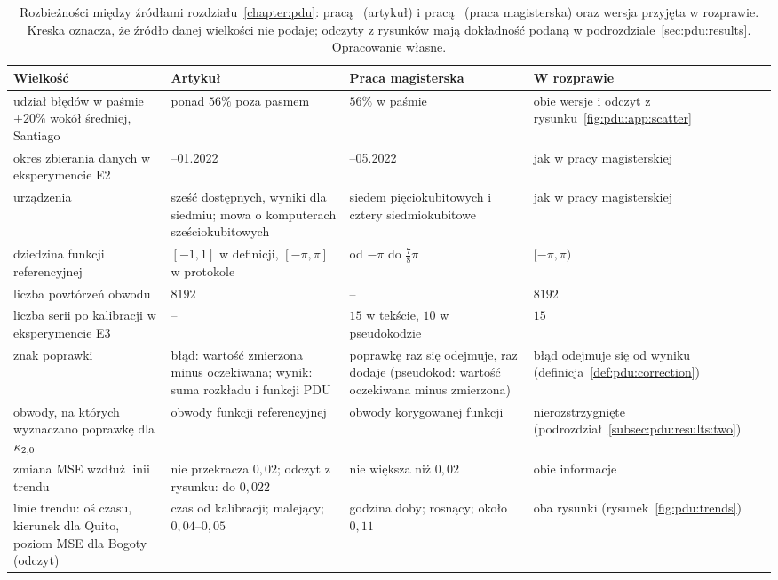 \begin{table}[htbp]
\centering
\caption[Rozbieżności między źródłami rozdziału o metodzie PDU]{Rozbieżności między źródłami rozdziału~\ref{chapter:pdu}: pracą~\cite{werner_experiment_driven_2022} (artykuł) i pracą~\cite{werner_magisterka_2022} (praca magisterska) oraz wersja przyjęta w rozprawie.
Kreska oznacza, że źródło danej wielkości nie podaje; odczyty z rysunków mają dokładność podaną w podrozdziale~\ref{sec:pdu:results}.
Opracowanie własne.}
\label{tab:pdu:app:discrepancies}
\footnotesize
\setlength{\tabcolsep}{4pt}
\begin{tabular}{@{}>{\raggedright\arraybackslash}p{3.5cm}>{\raggedright\arraybackslash}p{3.9cm}>{\raggedright\arraybackslash}p{3.9cm}>{\raggedright\arraybackslash}p{3.3cm}@{}}
\toprule
\textbf{Wielkość} & \textbf{Artykuł} & \textbf{Praca magisterska} & \textbf{W rozprawie} \\
\midrule
udział błędów w paśmie $\pm20\%$ wokół średniej, Santiago & ponad $56\%$ poza pasmem & $56\%$ w paśmie & obie wersje i odczyt z rysunku~\ref{fig:pdu:app:scatter} \\
okres zbierania danych w eksperymencie E2 & 05.2021--01.2022 & 02.2021--05.2022 & jak w pracy magisterskiej \\
urządzenia & sześć dostępnych, wyniki dla siedmiu; mowa o komputerach sześciokubitowych & siedem pięciokubitowych i cztery siedmiokubitowe & jak w pracy magisterskiej \\
dziedzina funkcji referencyjnej & $[-1,1]$ w definicji, $[-\pi,\pi]$ w protokole & od $-\pi$ do $\tfrac{7}{8}\pi$ & $[-\pi,\pi)$ \\
liczba powtórzeń obwodu & $8192$ & -- & $8192$ \\
liczba serii po kalibracji w eksperymencie E3 & -- & $15$ w tekście, $10$ w pseudokodzie & $15$ \\
znak poprawki & błąd: wartość zmierzona minus oczekiwana; wynik: suma rozkładu i funkcji PDU & poprawkę raz się odejmuje, raz dodaje (pseudokod: wartość oczekiwana minus zmierzona) & błąd odejmuje się od wyniku (definicja~\ref{def:pdu:correction}) \\
obwody, na których wyznaczano poprawkę dla $\kappa_{2,0}$ & obwody funkcji referencyjnej & obwody korygowanej funkcji & nierozstrzygnięte (podrozdział~\ref{subsec:pdu:results:two}) \\
zmiana MSE wzdłuż linii trendu & nie przekracza $0{,}02$; odczyt z rysunku: do $0{,}022$ & nie większa niż $0{,}02$ & obie informacje \\
linie trendu: oś czasu, kierunek dla Quito, poziom MSE dla Bogoty (odczyt) & czas od kalibracji; malejący; $0{,}04$--$0{,}05$ & godzina doby; rosnący; około $0{,}11$ & oba rysunki (rysunek~\ref{fig:pdu:trends}) \\

\end{tabular}
\end{table}
